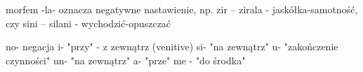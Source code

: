 morfem -la- oznacza negatywne nastawienie, np. zir -- zirala -
jaskółka-samotność, czy sini -- silani - wychodzić-opuszczać

no- negacja
i- "przy" - z zewnątrz (venitive)
si- "na zewnątrz"
u- "zakończenie czynności"
un- "na zewnątrz"
a- "prze"
me - "do środka"
